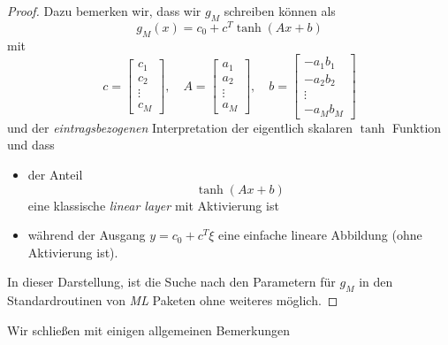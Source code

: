 \documentclass[
]{book}
\providecommand{\tightlist}{%
  \setlength{\itemsep}{0pt}\setlength{\parskip}{0pt}}
\theoremstyle{definition}
\theoremstyle{definition}
\theoremstyle{definition}
\theoremstyle{definition}
\theoremstyle{remark}
\begin{document}
\begin{proof}
Dazu bemerken wir, dass wir \(g_M\) schreiben können als
\begin{equation}
g_M(x) = c_0 + c^T \tanh(Ax+b)
\label{eq:eqn-gm-approx}
\end{equation}
mit
\begin{equation*}
c=
\begin{bmatrix}
c_1 \\ c_2 \\ \vdots \\ c_M
\end{bmatrix}, 
\quad
A=
\begin{bmatrix}
a_1 \\ a_2 \\ \vdots \\ a_M
\end{bmatrix}, 
\quad
b=
\begin{bmatrix}
-a_1b_1 \\ -a_2b_2 \\ \vdots \\ -a_Mb_M
\end{bmatrix}
\end{equation*}
und der \emph{eintragsbezogenen} Interpretation der eigentlich skalaren \(\tanh\)
Funktion und dass

\begin{itemize}
\tightlist
\item
  der Anteil
  \begin{equation*}
  \tanh (Ax+b)
  \end{equation*}
  eine klassische \emph{linear layer} mit Aktivierung ist
\item
  während der Ausgang \(y=c_0+c^T\xi\) eine einfache lineare Abbildung (ohne
  Aktivierung ist).
\end{itemize}

In dieser Darstellung, ist die Suche nach den Parametern für \(g_M\) in den
Standardroutinen von \emph{ML} Paketen ohne weiteres möglich.
\end{proof}

Wir schließen mit einigen allgemeinen Bemerkungen
\end{document}
